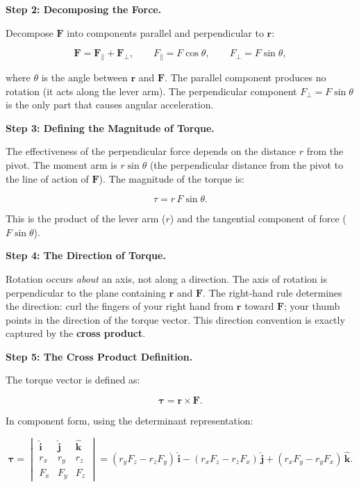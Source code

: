 \textbf{Step 2: Decomposing the Force.}

Decompose $\mathbf{F}$ into components parallel and perpendicular to $\mathbf{r}$:

\begin{equation}
\mathbf{F} = \mathbf{F}_\parallel + \mathbf{F}_\perp, \qquad F_\parallel = F\cos\theta, \qquad F_\perp = F\sin\theta,
\end{equation}

where $\theta$ is the angle between $\mathbf{r}$ and $\mathbf{F}$. The parallel component produces no rotation (it acts along the lever arm). The perpendicular component $F_\perp = F\sin\theta$ is the only part that causes angular acceleration.

\textbf{Step 3: Defining the Magnitude of Torque.}

The effectiveness of the perpendicular force depends on the distance $r$ from the pivot. The moment arm is $r\sin\theta$ (the perpendicular distance from the pivot to the line of action of $\mathbf{F}$). The magnitude of the torque is:

\begin{equation}
\tau = r\,F\sin\theta.
\end{equation}

This is the product of the lever arm ($r$) and the tangential component of force ($F\sin\theta$).

\textbf{Step 4: The Direction of Torque.}

Rotation occurs \emph{about} an axis, not along a direction. The axis of rotation is perpendicular to the plane containing $\mathbf{r}$ and $\mathbf{F}$. The right-hand rule determines the direction: curl the fingers of your right hand from $\mathbf{r}$ toward $\mathbf{F}$; your thumb points in the direction of the torque vector. This direction convention is exactly captured by the \textbf{cross product}.

\textbf{Step 5: The Cross Product Definition.}

The torque vector is defined as:

\begin{equation}
\boxed{\boldsymbol{\tau} = \mathbf{r} \times \mathbf{F}.}
\end{equation}

In component form, using the determinant representation:

\begin{equation}
\boldsymbol{\tau} = \begin{vmatrix} \mathbf{\hat{i}} & \mathbf{\hat{j}} & \mathbf{\hat{k}} \\ r_x & r_y & r_z \\ F_x & F_y & F_z \end{vmatrix} = (r_y F_z - r_z F_y)\,\mathbf{\hat{i}} - (r_x F_z - r_z F_x)\,\mathbf{\hat{j}} + (r_x F_y - r_y F_x)\,\mathbf{\hat{k}}.
\end{equation}

